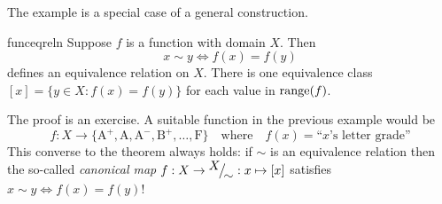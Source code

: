 The example is a special case of a general construction.

\begin{thm}{}{funceqreln}
	Suppose $f$ is a function with domain $X$. Then 
	\[
		x\sim y\iff f(x)=f(y)
	\]
	defines an equivalence relation on $X$. There is one equivalence class $[x]=\{y\in X:f(x)=f(y)\}$ for each value in $\operatorname{range}(f)$.
\end{thm}

The proof is an exercise. A suitable function in the previous example would be
\[
	f:X\to \bigl\{\mathrm{A^+,A,A^-,B^+,\ldots,F}\bigr\}\quad \text{where} \quad f(x) =\text{``$x$'s letter grade''}
\]
This converse to the theorem always holds: if $\sim$ is an equivalence relation then the so-called \emph{canonical map} $f:X\to {}^{\textstyle {X}}\!\big/_{\textstyle \!{\sim}}:x\mapsto [x]$ satisfies $x\sim y\Longleftrightarrow f(x)=f(y)$!

\goodbreak


